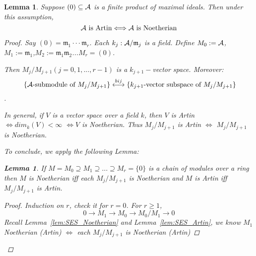 \documentclass[11pt]{article}
\newtheorem{lemma}[thm]{Lemma}
\newcommand{\scm}{{\mathfrak m}}
\newcommand{\cala}{{\cal A}}
\newcommand{\lrta}{\longrightarrow}
\newcommand{\llrta}{\longleftrightarrow}
\newcommand{\Llrta}{\Longleftrightarrow}
\begin{document}
\begin{lemma}\label{lem:Artin_Noetherin_product_of_maximals}
Suppose $(0)\subseteq \cala$ is a finite product of maximal ideals. Then under this assumption, 
$$
\cala\text{ is Artin}\Llrta \cala\text{ is Noetherian}
$$
\begin{proof}
Say $(0)=\scm_1\cdot \cdot \cdot \scm_r$. Each $k_j:\cala/\scm_j$ is a field. Define $M_0:=\cala$, $M_1:=\scm_1$,$M_2:=\scm_1\scm_2$...$M_r=(0)$.

Then $M_j/M_{j+1} (j=0,1,...,r-1)$ is a $k_{j+1}-$vector space. Moreover: 
$$
\text{
\{$\cala$-submodule of $M_j/M_{j+1}$\}}
\overset{bij}{\llrta}
\text{\{$k_{j+1}$-vector subspace of $M_j/M_{j+1}$\}}
$$.

In general, if $V$ is a vector space over a field $k$, then $V$ is Artin $\Llrta dim_k(V)<\infty$ $\Llrta V$ is Noetherian. Thus $M_j/M_{j+1}$ is Artin $\Llrta$ $M_j/M_{j+1}$ is Noetherian.

To conclude, we apply the following Lemma:
\begin{lemma}
If $M=M_0\supseteq M_1\supseteq ...\supseteq M_r=\{0\}$ is a chain of modules over a ring then $M$ is Noetherian iff each $M_j/M_{j+1}$ is Noetherian and $M$ is Artin iff $M_j/M_{j+1}$ is Artin.
\begin{proof}
Induction on $r$, check it for $r=0$.
For $r\geq 1$, 
$$
0\lrta M_1\lrta M_0\lrta M_0/M_1\lrta 0
$$ Recall Lemma~\ref{lem:SES_Noetherian} and Lemma~\ref{lem:SES_Artin}, we know $M_1$ Noetherian (Artin) $\Llrta$ each $M_j/M_{j+1}$ is Noetherian (Artin)
\end{proof}
\end{lemma}
\end{proof}
\end{lemma}
\end{document}
